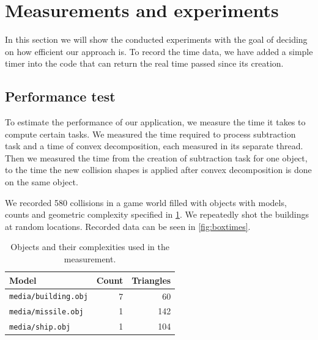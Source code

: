 \section{Measurements and experiments}
\label{sec:testing}
In this section we will  show the conducted experiments with the goal of deciding on how efficient our approach is.
To record the time data, we have added a simple timer into the code that can return the real time passed since its creation. 

\subsection{Performance test}
To estimate the performance of our application, we measure the time it takes to compute certain  tasks. We measured  the time required to process subtraction task and a time of convex decomposition, each measured in its separate thread. Then we measured the time from the creation of subtraction task for one object, to the time the new collision shapes is applied after convex decomposition is done on the same object. 

We recorded 580 
collisions in a game world filled with objects with models, counts and
geometric complexity specified in \cref{tab:objects}. We repeatedly shot the
buildings at random locations. Recorded data can be seen in \cref{fig:boxtimes}.

\begin{table}
	\centering
	\begin{tabular}{lrr}
Model & Count & Triangles \\
\hline
\texttt{media/building.obj} & 7 & 60 \\
\texttt{media/missile.obj} & 1 & 142 \\
\texttt{media/ship.obj} & 1 & 104
	\end{tabular}
	\caption{Objects and their complexities used in the measurement.}
	\label{tab:objects}
\end{table}

